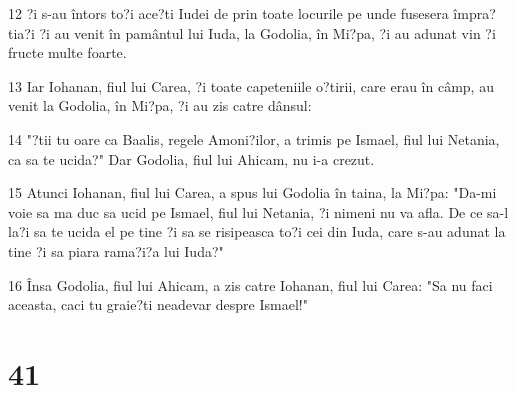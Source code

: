 \par 12 ?i s-au întors to?i ace?ti Iudei de prin toate locurile pe unde fusesera împra?tia?i ?i au venit în pamântul lui Iuda, la Godolia, în Mi?pa, ?i au adunat vin ?i fructe multe foarte.
\par 13 Iar Iohanan, fiul lui Carea, ?i toate capeteniile o?tirii, care erau în câmp, au venit la Godolia, în Mi?pa, ?i au zis catre dânsul:
\par 14 "?tii tu oare ca Baalis, regele Amoni?ilor, a trimis pe Ismael, fiul lui Netania, ca sa te ucida?" Dar Godolia, fiul lui Ahicam, nu i-a crezut.
\par 15 Atunci Iohanan, fiul lui Carea, a spus lui Godolia în taina, la Mi?pa: "Da-mi voie sa ma duc sa ucid pe Ismael, fiul lui Netania, ?i nimeni nu va afla. De ce sa-l la?i sa te ucida el pe tine ?i sa se risipeasca to?i cei din Iuda, care s-au adunat la tine ?i sa piara rama?i?a lui Iuda?"
\par 16 Însa Godolia, fiul lui Ahicam, a zis catre Iohanan, fiul lui Carea: "Sa nu faci aceasta, caci tu graie?ti neadevar despre Ismael!"

\chapter{41}

